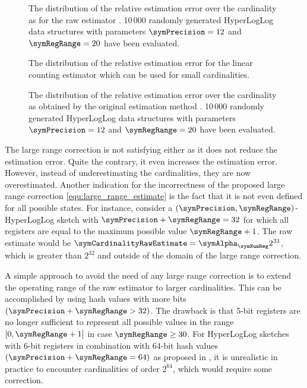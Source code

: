 \documentclass[a4paper]{scrartcl}
\begin{document}
\begin{figure}
\centering

\caption{The distribution of the relative estimation error over the cardinality as for the raw estimator \cite{Flajolet2007}. 10\,000 randomly generated HyperLogLog data structures with parameters $\symPrecision = 12$ and $\symRegRange=20$ have been evaluated.}
\label{fig:raw_estimate}
\end{figure}

\begin{figure}
\centering

\caption{The distribution of the relative estimation error for the linear counting estimator which can be used for small cardinalities.}
\label{fig:small_range_estimate}
\end{figure}

\begin{figure}
\centering

\caption{The distribution of the relative estimation error over the cardinality as obtained by the original estimation method \cite{Flajolet2007}. 10\,000 randomly generated HyperLogLog data structures with parameters $\symPrecision = 12$ and $\symRegRange=20$ have been evaluated.}
\label{fig:original_estimate}
\end{figure}

The large range correction is not satisfying either as it does not reduce the estimation error. Quite the contrary, it even increases the estimation error. However, instead of underestimating the cardinalities, they are now overestimated. Another indication for the incorrectness of the proposed large range correction \eqref{equ:large_range_estimate} is the fact that it is not even defined for all possible states. For instance, consider a $(\symPrecision,\symRegRange)$-HyperLogLog sketch with $\symPrecision+\symRegRange=32$ for which all registers are equal to the maximum possible value $\symRegRange+1$. The raw estimate would be $\symCardinalityRawEstimate = \symAlpha_\symNumReg 2^{33}$, which is greater than $2^{32}$ and outside of the domain of the large range correction.

A simple approach to avoid the need of any large range correction is to extend the operating range of the raw estimator to larger cardinalities. This can be accomplished by using hash values with more bits $(\symPrecision+\symRegRange>32)$. The drawback is that 5-bit registers are no longer sufficient to represent all possible values in the range $[0, \symRegRange+1]$ in case $\symRegRange \geq 30$. For HyperLogLog sketches with 6-bit registers in combination with 64-bit hash values $(\symPrecision+\symRegRange=64)$ as proposed in \cite{Heule2013}, it is unrealistic in practice to encounter cardinalities of order $2^{64}$, which would require some correction.
\end{document}

